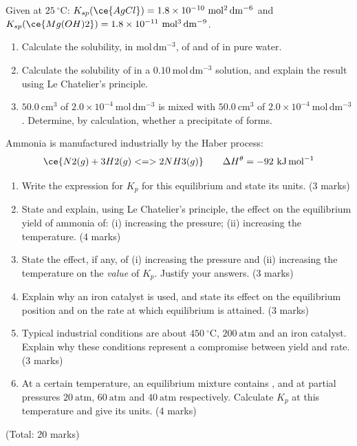 \documentclass[11pt]{article}
\newcounter{popsec}
\newcounter{popsub}
\newcommand{\courssub}[1]{%
  \stepcounter{popsub}%
  \par\vspace{9pt}\noindent{\popxbold\fontsize{11.5}{13}\selectfont\color{popink}{\color{poporange}\thepopsec.\thepopsub}\hspace{6pt}#1}\par\nopagebreak\vspace{4pt}
}
\begin{document}
\begin{exercice}
Given at $25\ ^{\circ}\mathrm{C}$: $K_{sp}(\ce{AgCl}) = 1.8\times 10^{-10}\ \mathrm{mol^{2}\,dm^{-6}}$ and $K_{sp}(\ce{Mg(OH)2}) = 1.8\times 10^{-11}\ \mathrm{mol^{3}\,dm^{-9}}$.
\begin{enumerate}
\item Calculate the solubility, in $\mathrm{mol\,dm^{-3}}$, of  and of  in pure water.
\item Calculate the solubility of  in a $0.10\ \mathrm{mol\,dm^{-3}}$  solution, and explain the result using Le Chatelier's principle.
\item $50.0\ \mathrm{cm^{3}}$ of $2.0\times 10^{-4}\ \mathrm{mol\,dm^{-3}}$  is mixed with $50.0\ \mathrm{cm^{3}}$ of $2.0\times 10^{-4}\ \mathrm{mol\,dm^{-3}}$ . Determine, by calculation, whether a precipitate of  forms.
\end{enumerate}
\end{exercice}

\courssub{I prepare for the GCE}

\begin{exercice}
Ammonia is manufactured industrially by the Haber process:
\[\ce{N2(g) + 3H2(g) <=> 2NH3(g)} \qquad \Delta H^{\theta} = -92\ \mathrm{kJ\,mol^{-1}}\]
\begin{enumerate}
\item Write the expression for $K_p$ for this equilibrium and state its units. \hfill (3 marks)
\item State and explain, using Le Chatelier's principle, the effect on the equilibrium yield of ammonia of: (i) increasing the pressure; (ii) increasing the temperature. \hfill (4 marks)
\item State the effect, if any, of (i) increasing the pressure and (ii) increasing the temperature on the \emph{value} of $K_p$. Justify your answers. \hfill (3 marks)
\item Explain why an iron catalyst is used, and state its effect on the equilibrium position and on the rate at which equilibrium is attained. \hfill (3 marks)
\item Typical industrial conditions are about $450\ ^{\circ}\mathrm{C}$, $200\ \mathrm{atm}$ and an iron catalyst. Explain why these conditions represent a compromise between yield and rate. \hfill (3 marks)
\item At a certain temperature, an equilibrium mixture contains ,  and  at partial pressures $20\ \mathrm{atm}$, $60\ \mathrm{atm}$ and $40\ \mathrm{atm}$ respectively. Calculate $K_p$ at this temperature and give its units. \hfill (4 marks)
\end{enumerate}
\hfill (Total: 20 marks)
\end{exercice}
\end{document}
